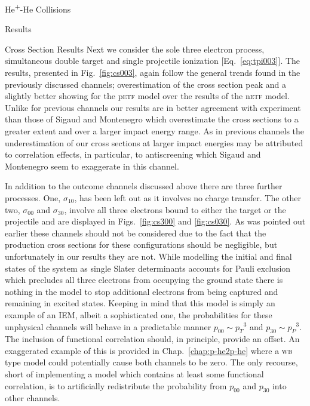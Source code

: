 \documentclass[a5paper, 9 pt]{extreport}
\begin{document}
\begin{chapter}{\texorpdfstring{He\textsuperscript{+}}{He+}-He Collisions \label{chap:hephe}}
\begin{section}{Results \label{sec:hephe-disc}}
\begin{subsection}{Cross Section Results \label{sec:hephe-res}}
         Next we consider the sole three electron process, simultaneous double target and single
         projectile ionization [Eq.~\eqref{eq:tpi003}]. The results, presented in Fig.~\ref{fig:cs003},
         again follow the general trends found in the previously discussed channels; overestimation of
         the cross section peak and a slightly better showing for the p\textsc{etf} model over the
         results of the n\textsc{etf} model. Unlike for previous channels our results are in better
         agreement with experiment than those of Sigaud and Montenegro which overestimate the cross
         sections to a greater extent and over a larger impact energy range. As in previous channels the
         underestimation of our cross sections at larger impact energies may be attributed to
         correlation effects, in particular, to antiscreening which  Sigaud and Montenegro seem to
         exaggerate in this channel.

         In addition to the outcome channels discussed above there are three further processes. One,
         $\sigma_{10}$, has been left out as it involves no charge transfer. The other two,
         $\sigma_{00}$ and $\sigma_{30}$, involve all three electrons bound to either the target or the
         projectile and are displayed in Figs.~\ref{fig:cs300} and \ref{fig:cs030}. As was pointed out
         earlier these channels should not be considered due to the fact that the production cross
         sections for these configurations should be negligible, but unfortunately in our results they
         are not. While modelling the initial and final states of the system as single Slater
         determinants accounts for Pauli exclusion which precludes all three electrons from occupying
         the ground state there is nothing in the model to stop additional electrons from being captured
         and remaining in excited states. Keeping in mind that this model is simply an example of an
         \textsc{IEM}, albeit a sophisticated one, the probabilities for these unphysical channels will
         behave in a predictable manner $p_{00} \sim {p_T}^3$ and $p_{30} \sim {p_P}^3$. The inclusion
         of functional correlation should, in principle, provide an offset. An exaggerated example of
         this is provided in Chap.~\ref{chap:p-he2p-he} where a \textsc{wb} type model could potentially
         cause both channels to be zero. The only recourse, short of implementing a model which contains
         at least some functional correlation, is to artificially redistribute the probability from
         $p_{00}$ and $p_{30}$ into other channels.


\end{subsection}
\end{section}
\end{chapter}
\end{document}
